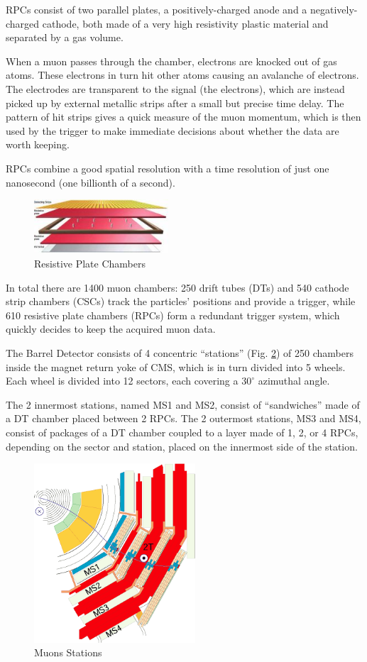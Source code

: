 RPCs consist of two parallel plates, a positively-charged anode and a negatively-charged cathode, both made of a very high resistivity plastic material and separated by a gas volume.

When a muon passes through the chamber, electrons are knocked out of gas atoms. These electrons in turn hit other atoms causing an avalanche of electrons. The electrodes are transparent to the signal (the electrons), which are instead picked up by external metallic strips after a small but precise time delay. The pattern of hit strips gives a quick measure of the muon momentum, which is then used by the trigger to make immediate decisions about whether the data are worth keeping. 

RPCs combine a good spatial resolution with a time resolution of just one nanosecond (one billionth of a second).
\begin{figure}[H]
  \centering
\includegraphics[width=5cm]{CMS_chapter_plots/RPClayers}
  \caption{Resistive Plate Chambers \label{fig:RPClayers}}
\end{figure}


In total there are 1400 muon chambers: 250 drift tubes (DTs) and 540 cathode strip chambers (CSCs) track the particles’ positions and provide a trigger, while 610 resistive plate chambers (RPCs) form a redundant trigger system, which quickly decides to keep the acquired muon data.

The Barrel Detector consists of 4 concentric “stations” (Fig. \ref{fig:mustations}) of 250 chambers inside the magnet return yoke of CMS, which is in turn divided into 5 wheels. Each wheel is divided into 12 sectors, each covering a $30^{\circ}$ azimuthal angle.

The 2 innermost stations, named MS1 and MS2, consist of “sandwiches” made of a DT chamber placed between 2 RPCs. The 2 outermost stations, MS3 and MS4, consist of packages of a DT chamber coupled to a layer made of 1, 2, or 4 RPCs, depending on the sector and station, placed on the innermost side of the station.

\begin{figure}[H]
  \centering
\includegraphics[width=6cm]{CMS_chapter_plots/mustations}
  \caption{Muons Stations \label{fig:mustations}}
\end{figure}

